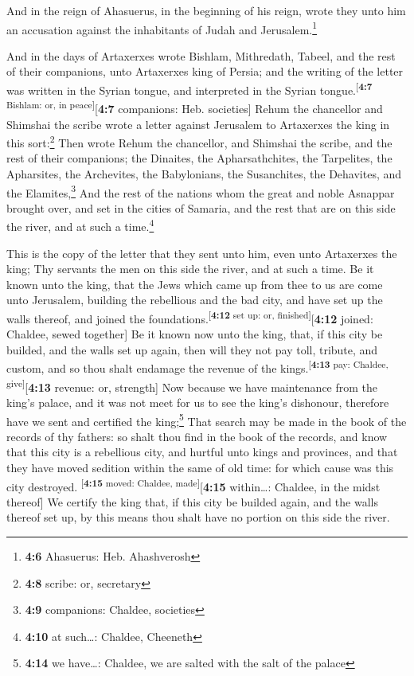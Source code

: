  And in the reign of Ahasuerus, in the beginning of his
reign, wrote they unto him an accusation against the inhabitants of
Judah and Jerusalem.\footnote{\textbf{4:6} Ahasuerus: Heb. Ahashverosh}

 And in the days of Artaxerxes wrote Bishlam, Mithredath,
Tabeel, and the rest of their companions, unto Artaxerxes king of
Persia; and the writing of the letter was written in the Syrian tongue,
and interpreted in the Syrian tongue.\textsuperscript{{[}\textbf{4:7}
Bishlam: or, in peace{]}}{[}\textbf{4:7} companions: Heb. societies{]}
 Rehum the chancellor and Shimshai the scribe wrote a
letter against Jerusalem to Artaxerxes the king in this sort:\footnote{\textbf{4:8}
  scribe: or, secretary}  Then wrote Rehum the chancellor,
and Shimshai the scribe, and the rest of their companions; the Dinaites,
the Apharsathchites, the Tarpelites, the Apharsites, the Archevites, the
Babylonians, the Susanchites, the Dehavites, and the
Elamites,\footnote{\textbf{4:9} companions: Chaldee, societies}
 And the rest of the nations whom the great and noble
Asnappar brought over, and set in the cities of Samaria, and the rest
that are on this side the river, and at such a time.\footnote{\textbf{4:10}
  at such\ldots: Chaldee, Cheeneth}

 This is the copy of the letter that they sent unto him,
even unto Artaxerxes the king; Thy servants the men on this side the
river, and at such a time.  Be it known unto the king,
that the Jews which came up from thee to us are come unto Jerusalem,
building the rebellious and the bad city, and have set up the walls
thereof, and joined the foundations.\textsuperscript{{[}\textbf{4:12}
set up: or, finished{]}}{[}\textbf{4:12} joined: Chaldee, sewed
together{]}  Be it known now unto the king, that, if this
city be builded, and the walls set up again, then will they not pay
toll, tribute, and custom, and so thou shalt endamage the revenue of the
kings.\textsuperscript{{[}\textbf{4:13} pay: Chaldee,
give{]}}{[}\textbf{4:13} revenue: or, strength{]}  Now
because we have maintenance from the king's palace, and it was not meet
for us to see the king's dishonour, therefore have we sent and certified
the king;\footnote{\textbf{4:14} we have\ldots: Chaldee, we are salted
  with the salt of the palace}  That search may be made
in the book of the records of thy fathers: so shalt thou find in the
book of the records, and know that this city is a rebellious city, and
hurtful unto kings and provinces, and that they have moved sedition
within the same of old time: for which cause was this city destroyed.
\textsuperscript{{[}\textbf{4:15} moved: Chaldee,
made{]}}{[}\textbf{4:15} within\ldots: Chaldee, in the midst thereof{]}
 We certify the king that, if this city be builded again,
and the walls thereof set up, by this means thou shalt have no portion
on this side the river.

